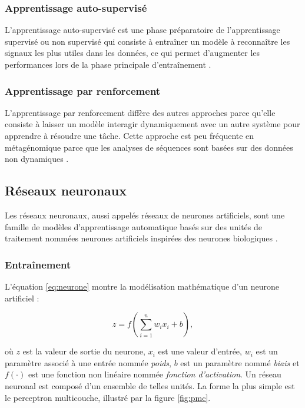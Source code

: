 \subsubsection{Apprentissage auto-supervisé}
L'apprentissage auto-supervisé est une phase préparatoire de l'apprentissage supervisé ou non
supervisé qui consiste à entraîner un modèle à reconnaître les signaux les plus utiles dans les
données, ce qui permet d'augmenter les performances lors de la phase principale d'entraînement
\cite{doersch2017}.

\subsubsection{Apprentissage par renforcement}
L'apprentissage par renforcement \cite{sutton2018} diffère des autres approches parce qu'elle
consiste à laisser un modèle interagir dynamiquement avec un autre système pour apprendre à résoudre
une tâche. Cette approche est peu fréquente en métagénomique parce que les analyses de séquences
sont basées sur des données non dynamiques \cite{roy2024}.

\subsection{Réseaux neuronaux}
Les réseaux neuronaux, aussi appelés réseaux de neurones artificiels, sont une famille de
modèles d'apprentissage automatique basés sur des unités de traitement nommées neurones artificiels
inspirées des neurones biologiques \cite{goodfellow2016}.

\subsubsection{Entraînement}

L'équation \ref{eq:neurone} montre la modélisation mathématique d'un neurone artificiel :

\begin{equation}
    \label{eq:neurone}
    z = f \left( \sum_{i = 1}^{n} w_i x_i + b \right),
\end{equation}

où $z$ est la valeur de sortie du neurone, $x_i$ est une valeur d'entrée, $w_i$ est un paramètre
associé à une entrée nommée \textit{poids}, $b$ est un paramètre nommé \textit{biais} et $f(\cdot)$
est une fonction non linéaire nommée \textit{fonction d'activation}. Un réseau neuronal est composé
d'un ensemble de telles unités. La forme la plus simple est le perceptron multicouche, illustré par
la figure \ref{fig:pmc}.

